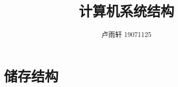 \documentclass{ctexart}
\title{计算机系统结构}
\author{卢雨轩 19071125}
\begin{document}
\maketitle
\tableofcontents

\section{储存结构}
\end{document}
